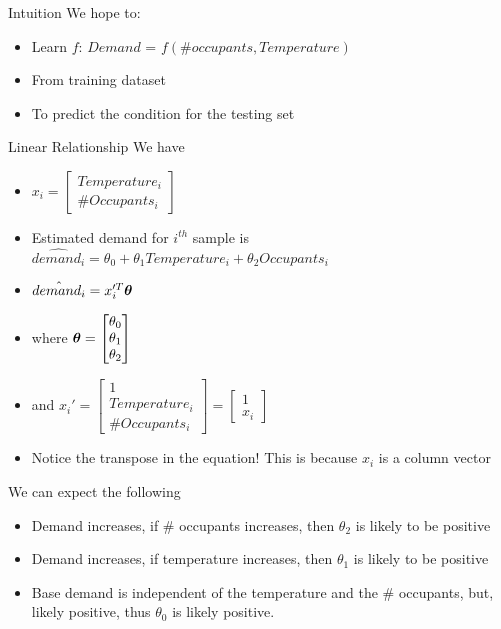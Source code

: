 \documentclass{beamer}
\begin{document}
\begin{frame}{Intuition}
    We hope to: 
    \begin{itemize}
        \item Learn $f$: $Demand$ = $f(\# occupants, Temperature)$
        \item From training dataset
        \item To predict the condition for the testing set
    \end{itemize}
\end{frame}


\begin{frame}{Linear Relationship}
    We have 
    \begin{itemize}[<+->]
    	\item $x_i = \begin{bmatrix}
    	Temperature_i\\\#Occupants_i
    	\end{bmatrix}$
        \item Estimated demand for $i^{th}$ sample is  $\hat{demand_{i}} = \theta_{0} + \theta_{1} Temperature_i + \theta_{2} Occupants_i$
        \item $\hat{demand_{i}} = x_{i}'^{T} \boldsymbol{\theta}$
        \item where $\boldsymbol{\theta} = \begin{bmatrix}\theta_0\\\theta_1\\ \theta_2
        \end{bmatrix}$
        \item and $x_{i}' = \begin{bmatrix}
        1\\Temperature_i\\\#Occupants_i
        \end{bmatrix} = \begin{bmatrix}
        1 \\ x_i
        \end{bmatrix}$
        \item Notice the transpose in the equation! This is because $x_{i}$ is a column vector
    \end{itemize}

\end{frame}





\begin{frame}{We can expect the following}
    \begin{itemize}
        \item<+-> Demand increases, if \# occupants increases, then $\theta_{2}$ is likely to be positive
        
        \item<+-> Demand increases, if temperature increases, then $\theta_{1}$ is likely to be positive
        
        \item<+-> Base demand is independent of the temperature and the \# occupants, but, likely positive, thus $\theta_0$ is likely positive.
        
    \end{itemize}
\end{frame}
\end{document}
